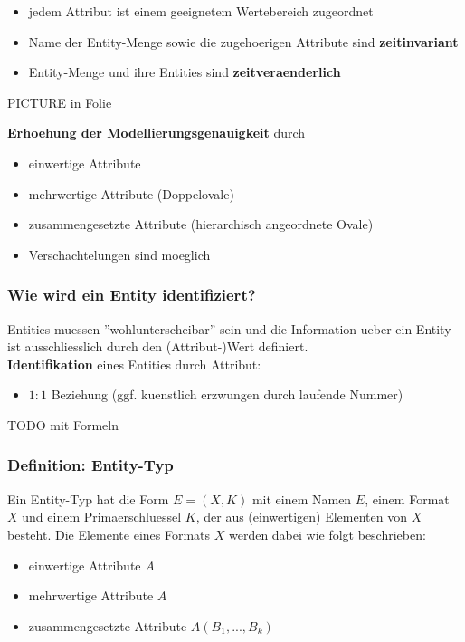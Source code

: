 \documentclass[a4paper,10pt]{article}
\begin{document}
\begin{itemize}
\item jedem Attribut ist einem geeignetem Wertebereich zugeordnet
\item Name der Entity-Menge sowie die zugehoerigen Attribute sind \textbf{zeitinvariant}
\item Entity-Menge und ihre Entities sind \textbf{zeitveraenderlich}
\end{itemize}

PICTURE in Folie

\textbf{Erhoehung der Modellierungsgenauigkeit} durch
\begin{itemize}
\item einwertige Attribute
\item mehrwertige Attribute (Doppelovale)
\item zusammengesetzte Attribute (hierarchisch angeordnete Ovale)
\item Verschachtelungen sind moeglich
\end{itemize}

\subsubsection{Wie wird ein Entity identifiziert?}
Entities muessen ''wohlunterscheibar'' sein und die Information ueber ein Entity ist ausschliesslich durch den (Attribut-)Wert definiert.\\
\textbf{Identifikation} eines Entities durch Attribut:
\begin{itemize}
\item $1:1$ Beziehung (ggf. kuenstlich erzwungen durch laufende Nummer)
\end{itemize}

TODO mit Formeln

\subsubsection{Definition: Entity-Typ}
Ein Entity-Typ hat die Form $E = (X, K)$ mit einem Namen $E$, einem Format $X$ und einem Primaerschluessel $K$, der aus (einwertigen) Elementen von $X$ besteht. Die Elemente eines Formats $X$ werden dabei wie folgt beschrieben:
\begin{itemize}
\item einwertige Attribute $A$
\item mehrwertige Attribute ${A}$
\item zusammengesetzte Attribute $A (B_1, ..., B_k)$
\end{itemize}
\end{document}
